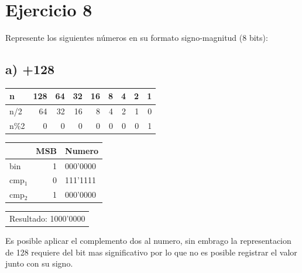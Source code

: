 \documentclass[12pt]{article}
\begin{document}
\section*{Ejercicio 8}
\label{sec:org1030369}
Represente los siguientes números en su formato signo-magnitud (8 bits):

\subsection*{a) +128}
\label{sec:orgdc51419}
\begin{mdframed}


\begin{center}
\begin{tabular}{lrrrrrrrr}
n & 128 & 64 & 32 & 16 & 8 & 4 & 2 & 1\\
\hline
n/2 & 64 & 32 & 16 & 8 & 4 & 2 & 1 & 0\\
n\%2 & 0 & 0 & 0 & 0 & 0 & 0 & 0 & 1\\
\end{tabular}
\end{center}

\begin{center}
\begin{tabular}{lrl}
 & MSB & Numero\\
\hline
bin & 1 & 000'0000\\
cmp\(_{\text{1}}\) & 0 & 111'1111\\
cmp\(_{\text{2}}\) & 1 & 000'0000\\
\end{tabular}
\end{center}

\begin{center}
\begin{tabular}{l}
Resultado: 1000'0000\\
\end{tabular}
\end{center}

Es posible aplicar el complemento dos al numero, sin embrago la representacion de 128 requiere del bit mas significativo por lo que no es posible registrar el valor junto con su signo. 
\end{mdframed}
\end{document}
